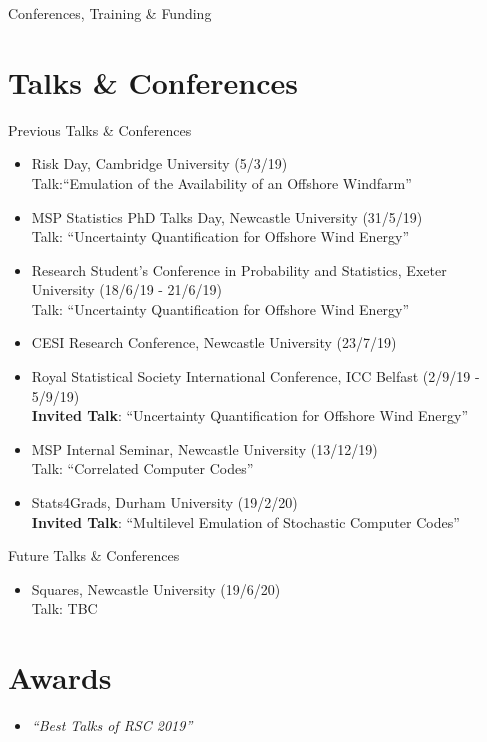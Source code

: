 \begin{chapter}{Conferences, Training \& Funding\label{Ch:Training}}

\section{Talks \& Conferences}
	Previous Talks \& Conferences
	\begin{itemize}
		\item Risk Day, Cambridge University (5/3/19) \\ Talk:``Emulation of the Availability of an Offshore Windfarm''
		\item MSP Statistics PhD Talks Day, Newcastle University (31/5/19)\\ Talk: ``Uncertainty Quantification for Offshore Wind Energy''
		\item Research Student's Conference in Probability and Statistics, Exeter University (18/6/19 - 21/6/19) \\ Talk: ``Uncertainty Quantification for Offshore Wind Energy''
		\item CESI Research Conference, Newcastle University (23/7/19)
		\item Royal Statistical Society International Conference, ICC Belfast (2/9/19 - 5/9/19) \\ \textbf{Invited Talk}: ``Uncertainty Quantification for Offshore Wind Energy'' 
		\item MSP Internal Seminar, Newcastle University  (13/12/19)\\ Talk: ``Correlated Computer Codes''
		\item Stats4Grads, Durham University (19/2/20) \\ \textbf{Invited Talk}: ``Multilevel Emulation of Stochastic Computer Codes''
	\end{itemize}
	Future Talks \& Conferences

	\begin{itemize}
		\item Squares, Newcastle University (19/6/20) \\ Talk: TBC
	\end{itemize}

\section{Awards}
	\begin{itemize}
		\item \textit{``Best Talks of RSC 2019''} 
	\end{itemize}


\end{chapter}
